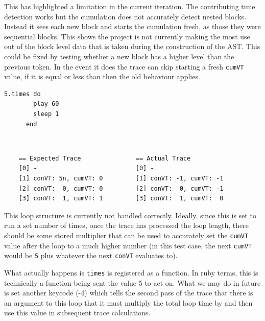 \documentclass[11pt, abstracton, twoside, titlepage=true]{scrartcl}
\begin{document}
This has highlighted a limitation in the current iteration. The contributing time 
detection works but the cumulation does not accurately detect nested blocks. 
Instead it sees each new block and starts the cumulation fresh, as those they were
sequential blocks. This shows the project is not currently making the most use out 
of the block level data that is taken during the construction of the AST. This could 
be fixed by testing whether a new block has a higher level than the previous token.
In the event it does the trace can skip starting a fresh \texttt{cumVT} value, if it 
is equal or less than then the old behaviour applies. 

\begin{minipage}{\textwidth}
	\begin{lstlisting}[style = sonicpi]
      5.times do
        play 60
        sleep 1
      end
	\end{lstlisting}
\end{minipage}
\\
\begin{lstlisting}
    == Expected Trace               == Actual Trace
    [0] -                           [0] -
    [1] conVT: 5n, cumVT: 0         [1] conVT: -1, cumVT: -1
    [2] conVT:  0, cumVT: 0         [2] conVT:  0, cumVT: -1
    [3] conVT:  1, cumVT: 1         [3] conVT:  1, cumVT:  0
\end{lstlisting}

This loop structure is currently not handled correctly. Ideally, since this is set 
to run a set number of times, once the trace has processed the loop length, there 
should be some stored multiplier that can be used to accurately set the 
\texttt{cumVT} value after the loop to a much higher number (in this test case, the 
next \texttt{cumVT} would be \texttt{5} plus whatever the next \texttt{conVT} 
evaluates to).

What actually happens is \texttt{times} is registered as a function. In ruby terms,
this is technically a function being sent the value 5 to act on. What we may do in 
future is set another keycode (-4) which tells the second pass of the trace that 
there is an argument to this loop that it must multiply the total loop time by and
then use this value in subsequent trace calculations.
\end{document}
